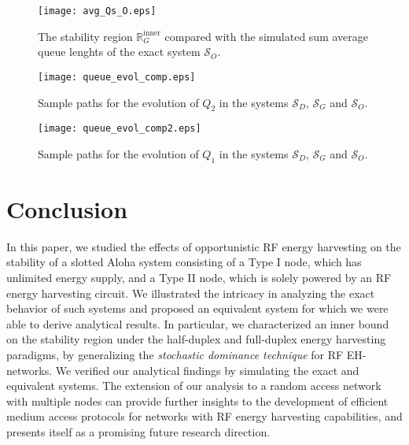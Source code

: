 \documentclass[draftcls,12pt,onecolumn]{IEEEtran}
\begin{document}
\begin{figure}[t]
\texttt{[image: avg\_Qs\_O.eps]} 
\centering
\caption{The stability region $\mathbb{R}_G^{\text{inner}}$ compared with the simulated sum average queue lenghts of the exact system $\mathcal{S}_O$. }\label{fig: eval avg_Qs O}
\end{figure}

\begin{figure}[t]
\texttt{[image: queue\_evol\_comp.eps]} 
\centering
\caption{Sample paths for the evolution of $Q_2$ in the systems $ \mathcal{S}_D$, $ \mathcal{S}_G$ and $ \mathcal{S}_O$. }\label{fig: sample path Q2}
\end{figure}

\begin{figure}[t]
\texttt{[image: queue\_evol\_comp2.eps]} 
\centering
\caption{Sample paths for the evolution of $Q_1$ in the systems $ \mathcal{S}_D$, $ \mathcal{S}_G$ and $ \mathcal{S}_O$. }\label{fig: sample path Q1}
\end{figure}


\section{Conclusion} \label{sec:conclusions}
In this paper, we studied the effects of opportunistic RF energy harvesting on the stability of a slotted Aloha system consisting of a Type I node, which has unlimited energy supply, and a Type II node, which is solely powered by an RF energy harvesting circuit. We illustrated the intricacy in analyzing the exact behavior of such systems and proposed an equivalent system for which we were able to derive analytical results. In particular, we characterized an inner bound on the stability region under the half-duplex and full-duplex energy harvesting paradigms, by generalizing the \emph{stochastic dominance technique} for RF EH-networks. We verified our analytical findings by simulating the exact and equivalent systems. The extension of our analysis to a random access network with multiple nodes can provide further insights to the development of efficient medium access protocols for networks with RF energy harvesting capabilities, and presents itself as a promising future research direction. 






\end{document}
